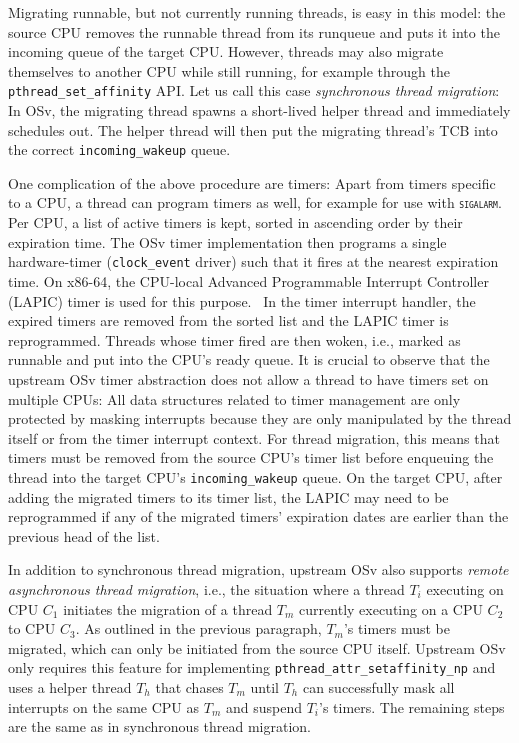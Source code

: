 \documentclass[12pt,a4paper]{book}
\begin{document}
Migrating runnable, but not currently running threads, is easy in this model:
the source CPU removes the runnable thread from its runqueue and puts it into the incoming queue of the target CPU.
However, threads may also migrate themselves to another CPU while still running, for example through the \lstinline[style=figurecpp]{pthread_set_affinity} API.
Let us call this case \emph{synchronous thread migration}:
In OSv, the migrating thread spawns a short-lived helper thread and immediately schedules out.
The helper thread will then put the migrating thread's TCB into the correct \lstinline[style=figurecpp]{incoming_wakeup} queue.~\cite{osvGit}

One complication of the above procedure are timers:
Apart from timers specific to a CPU, a thread can program timers as well, for example for use with \textsc{\texttt{sigalarm}}.
Per CPU, a list of active timers is kept, sorted in ascending order by their expiration time.
The OSv timer implementation then programs a single hardware-timer (\lstinline[style=figurecpp]{clock_event} driver) such that it fires at the nearest expiration time.
On x86-64, the CPU-local Advanced Programmable Interrupt Controller (LAPIC) timer is used for this purpose.~\cite{intelSDMLAPICTimer}
In the timer interrupt handler, the expired timers are removed from the sorted list and the LAPIC timer is reprogrammed.
Threads whose timer fired are then woken, i.e., marked as runnable and put into the CPU's ready queue.
It is crucial to observe that the upstream OSv timer abstraction does not allow a thread to have timers set on multiple CPUs:
All data structures related to timer management are only protected by masking interrupts because they are only manipulated by the thread itself or from the timer interrupt context.
For thread migration, this means that timers must be removed from the source CPU's timer list before enqueuing the thread into the target CPU's \lstinline[style=figurecpp]{incoming_wakeup} queue.
On the target CPU, after adding the migrated timers to its timer list, the LAPIC may need to be reprogrammed if any of the migrated timers' expiration dates are earlier than the previous head of the list.~\cite{osvGit}

In addition to synchronous thread migration, upstream OSv also supports \emph{remote asynchronous thread migration}, i.e., the situation where a thread $T_i$ executing on CPU $C_1$ initiates the migration of a thread $T_m$ currently executing on a CPU $C_2$ to CPU $C_3$.
As outlined in the previous paragraph, $T_m$'s timers must be migrated, which can only be initiated from the source CPU itself.
Upstream OSv only requires this feature for implementing \lstinline[style=figurecpp]{pthread_attr_setaffinity_np} and uses a helper thread $T_h$ that chases $T_m$ until $T_h$ can successfully mask all interrupts on the same CPU as $T_m$ and suspend $T_i$'s timers.
The remaining steps are the same as in synchronous thread migration.~\cite{osvGit}
\end{document}
